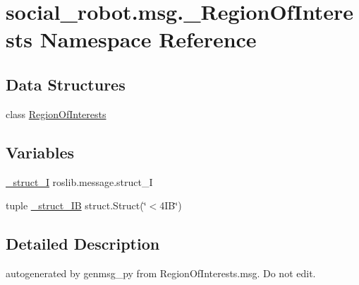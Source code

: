 \hypertarget{namespacesocial__robot_1_1msg_1_1__RegionOfInterests}{\section{social\-\_\-robot.\-msg.\-\_\-\-Region\-Of\-Interests Namespace Reference}
\label{namespacesocial__robot_1_1msg_1_1__RegionOfInterests}
}
\subsection*{Data Structures}
\begin{DoxyCompactItemize}
\item 
class \hyperlink{classsocial__robot_1_1msg_1_1__RegionOfInterests_1_1RegionOfInterests}{Region\-Of\-Interests}
\end{DoxyCompactItemize}
\subsection*{Variables}
\begin{DoxyCompactItemize}
\item 
\hyperlink{namespacesocial__robot_1_1msg_1_1__RegionOfInterests_a83e18b39970122a3136e3db15ab60233}{\-\_\-struct\-\_\-\-I} roslib.\-message.\-struct\-\_\-\-I
\item 
tuple \hyperlink{namespacesocial__robot_1_1msg_1_1__RegionOfInterests_a03a926b8bd3a511c2a25ce654791cc7b}{\-\_\-struct\-\_\-I\-B} struct.\-Struct(\char`\"{}$<$4\-I\-B\char`\"{})
\end{DoxyCompactItemize}


\subsection{Detailed Description}
\begin{DoxyVerb}autogenerated by genmsg_py from RegionOfInterests.msg. Do not edit.\end{DoxyVerb}
 

